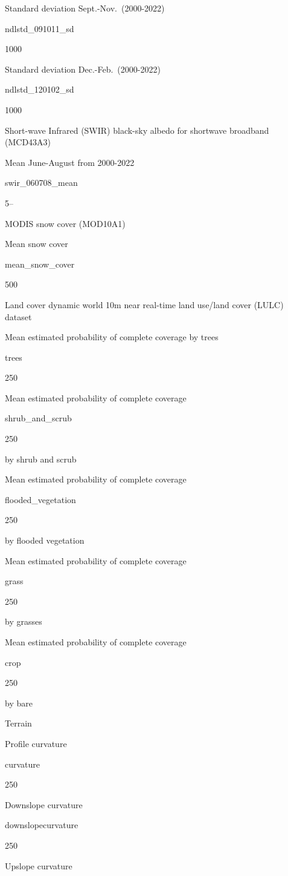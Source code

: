\documentclass[
  10pt,
  b5paper,
  oneside]{book}
\begin{document}
Standard deviation Sept.-Nov.~(2000-2022)

ndlstd\_091011\_sd

1000

Standard deviation Dec.-Feb.~(2000-2022)

ndlstd\_120102\_sd

1000

Short-wave Infrared (SWIR) black-sky albedo for shortwave broadband (MCD43A3)

Mean June-August from 2000-2022

swir\_060708\_mean

5--

MODIS snow cover (MOD10A1)

Mean snow cover

mean\_snow\_cover

500

Land cover dynamic world 10m near real-time land use/land cover (LULC) dataset

Mean estimated probability of complete coverage by trees

trees

250

Mean estimated probability of complete coverage

shrub\_and\_scrub

250

by shrub and scrub

Mean estimated probability of complete coverage

flooded\_vegetation

250

by flooded vegetation

Mean estimated probability of complete coverage

grass

250

by grasses

Mean estimated probability of complete coverage

crop

250

by bare

Terrain

Profile curvature

curvature

250

Downslope curvature

downslopecurvature

250

Upslope curvature
\end{document}

